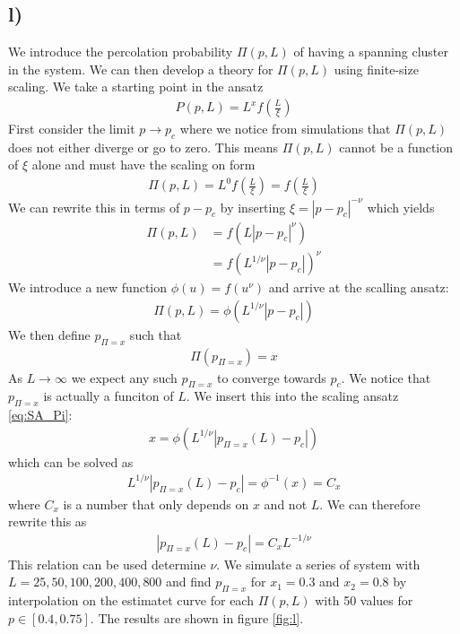 \documentclass[reprint, amsmath, amssymb, aps]{revtex4-2}
\begin{document}
\subsection*{l)}
We introduce the percolation probability $\Pi(p,L)$ of having a spanning cluster in the system. We can then develop a theory for $\Pi(p,L)$ using finite-size scaling. We take a starting point in the ansatz
\begin{align*}
  P(p,L) = L^x f{\left( \frac{L}{\xi}\right)}
\end{align*}
First consider the limit $p \to p_c$ where we notice from simulations that $\Pi(p,L)$ does not either diverge or go to zero. This means $\Pi(p,L)$ cannot be a function of $\xi$ alone and must have the scaling on form
\begin{align*}
  \Pi(p,L) = L^0f{\left( \frac{L}{\xi}\right)} = f{\left( \frac{L}{\xi}\right)}
\end{align*}
We can rewrite this in terms of $p-p_c$ by inserting $\xi = |p-p_c|^{-\nu}$ which yields
\begin{align*}
  \Pi(p,L) &= f\left(L |p-p_c|^{\nu}\right) \\
  &= f\left(L^{1/\nu} |p-p_c|\right)^\nu
\end{align*}
We introduce a new function $\phi(u) = f\left(u^\nu\right)$ and arrive at the scalling ansatz:
\begin{align}
  \Pi(p,L) = \phi(L^{1/\nu} |p-p_c|)
  \label{eq:SA_Pi}
\end{align}
We then define $p_{\Pi=x}$ such that
\begin{align*}
  \Pi(p_{\Pi = x}) = x
\end{align*}
As $L\to\infty$ we expect any such $p_{\Pi = x}$ to converge towards $p_c$. We notice that $p_{\Pi = x}$ is actually a funciton of $L$. We insert this into the scaling ansatz \ref{eq:SA_Pi}:
\begin{align*}
  x = \phi(L^{1/\nu} |p_{\Pi = x}(L)-p_c|)
\end{align*}
which can be solved as
\begin{align*}
  L^{1/\nu} |p_{\Pi = x}(L)-p_c| = \phi^{-1}(x) = C_x
\end{align*}
where $C_x$ is a number that only depends on $x$ and not $L$. We can therefore rewrite this as
\begin{align}
  |p_{\Pi = x}(L)-p_c| = C_x L^{-1/\nu}
  \label{eq:rel_nu}
\end{align}
This relation can be used determine $\nu$. We simulate a series of system with $L = 25,50,100,200,400,800$ and find $p_{\Pi = x}$ for $x_1=0.3$ and $x_2=0.8$ by interpolation on the estimatet curve for each $\Pi(p,L)$ with 50 values for $p \in [0.4, 0.75]$. The results are shown in figure \ref{fig:l}.
\end{document}
